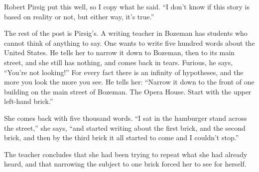 
Robert Pirsig put this well, so I copy what he said. ``I don't know if this story is based on reality or not, but either way, it's true.'' 

The rest of the post is Pirsig's. A writing teacher in Bozeman has students who cannot think of anything to say. One wants to write five hundred words about the United States. He tells her to narrow it down to Bozeman, then to its main street, and she still has nothing, and comes back in tears. Furious, he says, ``You're not looking!'' For every fact there is an infinity of hypotheses, and the more you look the more you see. He tells her: ``Narrow it down to the front of one building on the main street of Bozeman. The Opera House. Start with the upper left-hand brick.''

She comes back with five thousand words. ``I sat in the hamburger stand across the street,'' she says, ``and started writing about the first brick, and the second brick, and then by the third brick it all started to come and I couldn't stop.''

The teacher concludes that she had been trying to repeat what she had already heard, and that narrowing the subject to one brick forced her to see for herself. 
